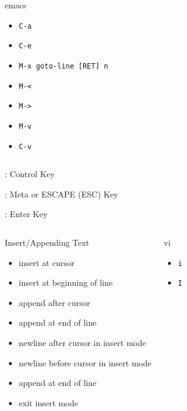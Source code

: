\documentclass[slidestop,mathserif,compress,xcolor=svgnames]{beamer}
\newenvironment{eblock}[0]
{
\begin{beamerboxesrounded}[upper=uppercol2,lower=lowercol2,shadow=true]}
{\end{beamerboxesrounded}}
\begin{document}
\begin{frame}[allowframebreaks]
{\begin{columns}
\begin{eblock}{emacs}
\begin{itemize}
      \item \texttt{C-a}
      \item \texttt{C-e}
      \item \texttt{M-x goto-line [RET] n}
      \item \texttt{M-<}
      \item \texttt{M->}
      \item \texttt{M-v}
      \item \texttt{C-v}
    \end{itemize}
    \end{eblock}
  \end{columns}
  }
  \vspace{-0.1cm}
  \begin{columns}
    \begin{itemize}
      {\scriptsize
      \item[C]: Control Key
      \item[M]: Meta or ESCAPE (ESC) Key
      \item[{[RET]}]: Enter Key
      }
    \end{itemize}
  \end{columns}
  \framebreak
  {\scriptsize
  \begin{columns}
    \vspace{-0.5cm}
    \begin{eblock}{Insert/Appending Text}
    \begin{itemize}
      \item insert at cursor 
      \item insert at beginning of line
      \item append after cursor
      \item append at end of line
      \item newline after cursor in insert mode
      \item newline before cursor in insert mode
      \item append at end of line
      \item exit insert mode
    \end{itemize}
    \end{eblock}
    \vspace{-0.5cm}
    \begin{eblock}{vi}
    \begin{itemize}
      \item \texttt{i}
      \item \texttt{I}

\end{itemize}
\end{eblock}
\end{columns}}
\end{frame}
\end{document}
